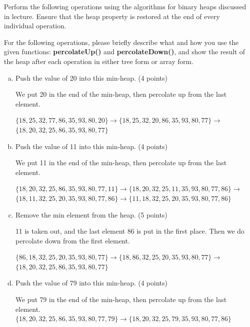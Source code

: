 \documentclass[11pt]{exam}
\begin{document}
Perform the following operations using the algorithms for binary heaps discussed in lecture. Ensure that the heap property is restored at the end of every individual operation.

For the following operations, please briefly describe what and how you use the given functions: \textbf{percolateUp()} and \textbf{percolateDown()}, and show the result of the heap after each operation in either tree form or array form.

\begin{enumerate}[a)]
\item Push the value of 20 into this min-heap. (4 points)
\begin{solution}
We put 20 in the end of the min-heap, then 
percolate up from the last element.
\par 
$\{18,25,32,77,86,35,93,80,20\} \rightarrow 
\{18,25,32,20,86,35,93,80,77\} \rightarrow$\\
$\{18,20,32,25,86,35,93,80,77\}$
\end{solution}

\item Push the value of 11 into this min-heap. (4 points)
\begin{solution}
    We put 11 in the end of the min-heap, then 
    percolate up from the last element.
\par 
    $\{18,20,32,25,86,35,93,80,77,11\} \rightarrow
    \{18,20,32,25,11,35,93,80,77,86\} \rightarrow$\\
    $\{18,11,32,25,20,35,93,80,77,86\} \rightarrow
    \{11,18,32,25,20,35,93,80,77,86\}$
\end{solution}

\item Remove the min element from the heap. (5 points)
\begin{solution}
11 is taken out, and the last element 86 is put in the first place. Then we do 
percolate down from the first element. \par 
$\{86,18,32,25,20,35,93,80,77\} \rightarrow
\{18,86,32,25,20,35,93,80,77\} \rightarrow$
\\ $\{18,20,32,25,86,35,93,80,77\}$
\end{solution}

\item Push the value of 79 into this min-heap. (4 points)
\begin{solution}
    We put 79 in the end of the min-heap, then 
    percolate up from the last element.
$\{18,20,32,25,86,35,93,80,77,79\} \rightarrow
\{18,20,32,25,79,35,93,80,77,86\}$
\end{solution}


\end{enumerate}
\end{document}
